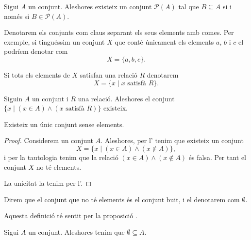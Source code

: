 \documentclass[../../Main.tex]{subfiles}
\begin{document}
	\begin{axiom}
		\label{axiom:conjunt potència}
		Sigui \(A\) un conjunt. Aleshores existeix un conjunt \(\mathcal{P}(A)\) tal que \(B\subseteq A\) si i només si \(B\in\mathcal{P}(A)\).
	\end{axiom}
	\begin{notation}
		Denotarem els conjunts com claus separant els seus elements amb comes. Per exemple, si tinguéssim un conjunt \(X\) que conté únicament els elements \(a\), \(b\) i \(c\) el podríem denotar com
		\[X=\{a,b,c\}.\]
		
		Si tots els elements de \(X\) satisfan una relació \(R\) denotarem
		\[X=\{x\mid x\text{ satisfà }R\}.\]
	\end{notation}
	\begin{axiom}
		\label{axiom:axioma de separació}
		Siguin \(A\) un conjunt i \(R\) una relació. Aleshores el conjunt \(\{x\mid(x\in A)\land(x\text{ satisfà }R)\}\) existeix.
	\end{axiom}
	\begin{proposition}
		\label{prop:conjunt buit}
		Existeix un únic conjunt sense elements.
		\begin{proof}
			Considerem un conjunt \(A\). Aleshores, per l' tenim que existeix un conjunt
			\[X=\{x\mid(x\in A)\land(x\notin A)\},\]
			i per la tautologia  tenim que la relació \((x\in A)\land(x\notin A)\) és falsa. Per tant el conjunt \(X\) no té elements.
			
			La unicitat la tenim per l'.
		\end{proof}
	\end{proposition}
	\begin{definition}
		Direm que el conjunt que no té elements és el conjunt buit, i el denotarem com \(\emptyset\).
		
		Aquesta definició té sentit per la proposició .
	\end{definition}
	\begin{axiom}
		\label{axiom:axioma de regularitat}
		Sigui \(A\) un conjunt. Aleshores tenim que \(\emptyset\subseteq A\).
	\end{axiom}
\end{document}
